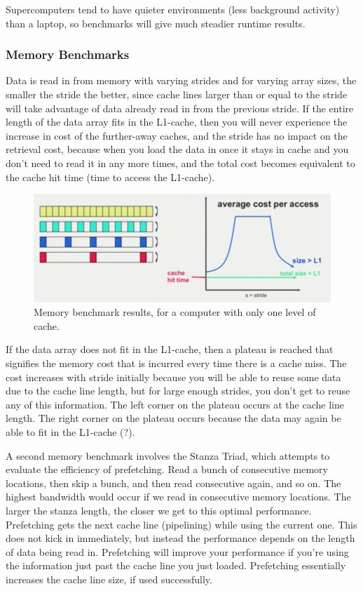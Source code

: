 \documentclass[10pt]{article}
\begin{document}
\begin{flushleft}
Supercomputers tend to have quieter environments (less background activity) than a laptop, so benchmarks will give much steadier runtime results. 

\subsubsection{Memory Benchmarks}

Data is read in from memory with varying strides and for varying array sizes, the smaller the stride the better, since cache lines larger than or equal to the stride will take advantage of data already read in from the previous stride. If the entire length of the data array fits in the L1-cache, then you will never experience the increase in cost of the further-away caches, and the stride has no impact on the retrieval cost, because when you load the data in once it stays in cache and you don't need to read it in any more times, and the total cost becomes equivalent to the cache hit time (time to access the L1-cache).

\begin{figure}[H]
\centering
\includegraphics[width=0.75\linewidth]{figures/membench.pdf}
\caption{Memory benchmark results, for a computer with only one level of cache.}
\end{figure}

If the data array does not fit in the L1-cache, then a plateau is reached that signifies the memory cost that is incurred every time there is a cache miss. The cost increases with stride initially because you will be able to reuse some data due to the cache line length, but for large enough strides, you don't get to reuse any of this information. The left corner on the plateau occurs at the cache line length. The right corner on the plateau occurs because the data may again be able to fit in the L1-cache (?).

A second memory benchmark involves the Stanza Triad, which attempts to evaluate the efficiency of prefetching. Read a bunch of consecutive memory locations, then skip a bunch, and then read consecutive again, and so on. The highest bandwidth would occur if we read in consecutive memory locations. The larger the stanza length, the closer we get to this optimal performance. Prefetching gets the next cache line (pipelining) while using the current one. This does not kick in immediately, but instead the performance depends on the length of data being read in. Prefetching will improve your performance if you're using the information just past the cache line you just loaded. Prefetching essentially increases the cache line size, if used successfully.


\end{flushleft}
\end{document}
